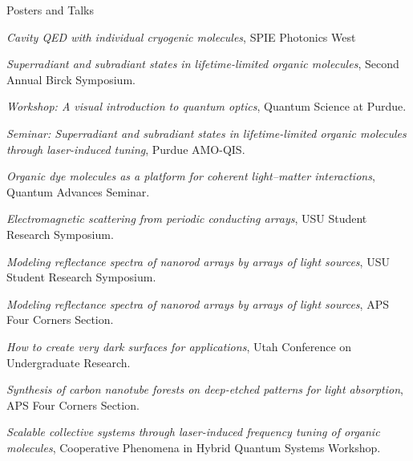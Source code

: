 \begin{rubric}{Posters and Talks}


\entry*[Jan 2026]%
\emph{Cavity QED with individual cryogenic molecules}, SPIE Photonics West\par

\entry*[Apr 2024]%
\emph{Superradiant and subradiant states in lifetime-limited organic molecules}, Second Annual Birck Symposium.\par

\entry*[Apr 2024]%
\emph{Workshop: A visual introduction to quantum optics}, Quantum Science at Purdue.\par

\entry*[Sept 2023]%
\emph{Seminar: Superradiant and subradiant states in lifetime-limited organic molecules through laser-induced tuning}, Purdue AMO-QIS.\par

\entry*[Oct 2022]%
\emph{Organic dye molecules as a platform for coherent light--matter interactions}, Quantum Advances Seminar.\par

\entry*[Apr 2021]%
\emph{Electromagnetic scattering from periodic conducting arrays}, USU Student Research Symposium.\par

\entry*[Dec 2020]%
\emph{Modeling reflectance spectra of nanorod arrays by arrays of light sources}, USU Student Research Symposium.\par

\entry*[Oct 2020]%
\emph{Modeling reflectance spectra of nanorod arrays by arrays of light sources}, APS Four Corners Section.\par

\entry*[Feb 2020]%
\emph{How to create very dark surfaces for applications}, Utah Conference on Undergraduate Research.\par

\entry*[Oct 2019]%
\emph{Synthesis of carbon nanotube forests on deep-etched patterns for light absorption}, APS Four Corners Section.\par


\entry*[Aug 2024]%
\emph{Scalable collective systems through laser-induced frequency tuning of organic molecules}, Cooperative Phenomena in Hybrid Quantum Systems Workshop.\par


\end{rubric}

